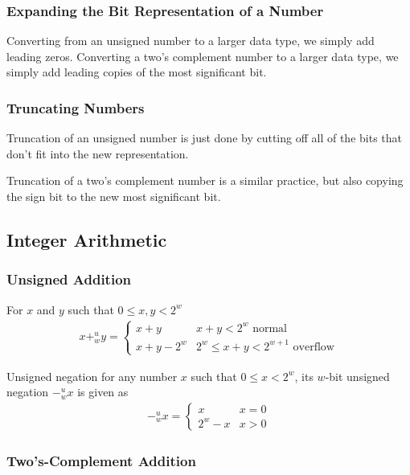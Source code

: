 \documentclass[10pt]{armath}
\begin{document}
\subsubsection{Expanding the Bit Representation of a Number}%
\label{ssub:expanding_the_bit_representation_of_a_number}

Converting from an unsigned number to a larger data type, we simply add leading
zeros. Converting a two's complement number to a larger data type, we simply
add leading copies of the most significant bit.

\subsubsection{Truncating Numbers}%
\label{ssub:truncating_numbers}

Truncation of an unsigned number is just done by cutting off all of the bits
that don't fit into the new representation.

Truncation of a two's complement number is a similar practice, but also
copying the sign bit to the new most significant bit.

\subsection{Integer Arithmetic}%
\label{sub:integer_arithmetic}

\subsubsection{Unsigned Addition}%
\label{ssub:unsigned_addition}

For $x$ and $y$ such that $0\leq x,y <2^w$
\begin{align*}
  x+_w^uy=\begin{cases}
    x+y & x+y < 2^w  \text{  normal}\\
    x + y - 2^w & 2^w \leq x+y < 2^{w+1}  \text{  overflow}
  \end{cases}
\end{align*}

Unsigned negation
for any number $x$ such that $0\leq x<2^w$, its $w$-bit unsigned negation
$-_w^ux$ is given as
\begin{align*}
  -_w^ux=\begin{cases}
    x & x=0\\
    2^w-x & x>0
  \end{cases}
\end{align*}

\subsubsection{Two's-Complement Addition}%
\label{ssub:two_s_complement_addition}
\end{document}
